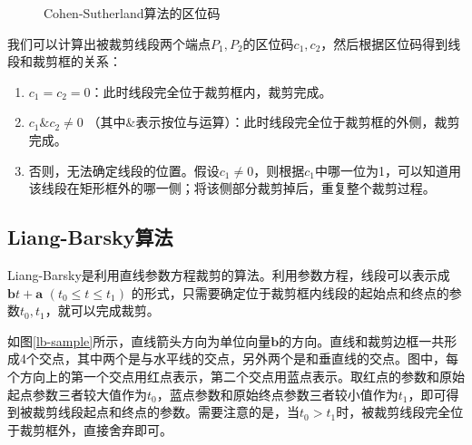 \documentclass[a4paper,12pt]{article}
\begin{document}
\begin{figure}[htb]
\centering
{} %
\caption{Cohen-Sutherland算法的区位码} \label{ch-code}
\end{figure}

我们可以计算出被裁剪线段两个端点$P_1, P_2$的区位码$c_1, c_2$，然后根据区位码得到线段和裁剪框的关系：
\begin{enumerate}
	\item $c_1 = c_2 = 0$：此时线段完全位于裁剪框内，裁剪完成。
	\item $c_1 \& c_2 \neq 0$ （其中$\&$表示按位与运算）：此时线段完全位于裁剪框的外侧，裁剪完成。
	\item 否则，无法确定线段的位置。假设$c_1 \neq 0$，则根据$c_1$中哪一位为1，可以知道用该线段在矩形框外的哪一侧；将该侧部分裁剪掉后，重复整个裁剪过程。
\end{enumerate}

\subsection{Liang-Barsky算法}
Liang-Barsky是利用直线参数方程裁剪的算法。利用参数方程，线段可以表示成$\bm{b}t + \bm{a}$ $(t_0 \leq t \leq t_1)$ 的形式，只需要确定位于裁剪框内线段的起始点和终点的参数$t_0, t_1$，就可以完成裁剪。

如图\ref{lb-sample}所示，直线箭头方向为单位向量$\bm{b}$的方向。直线和裁剪边框一共形成4个交点，其中两个是与水平线的交点，另外两个是和垂直线的交点。图中，每个方向上的第一个交点用红点表示，第二个交点用蓝点表示。取红点的参数和原始起点参数三者较大值作为$t_0$，蓝点参数和原始终点参数三者较小值作为$t_1$，即可得到被裁剪线段起点和终点的参数。需要注意的是，当$t_0 > t_1$时，被裁剪线段完全位于裁剪框外，直接舍弃即可。
\end{document}

